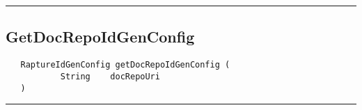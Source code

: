 \rule{15cm}{2pt}
\subsection{GetDocRepoIdGenConfig}
\label{Api:GetDocRepoIdGenConfig}
\begin{verbatim}
   RaptureIdGenConfig getDocRepoIdGenConfig (
           String    docRepoUri
   )
\end{verbatim}



\rule{15cm}{2pt}
